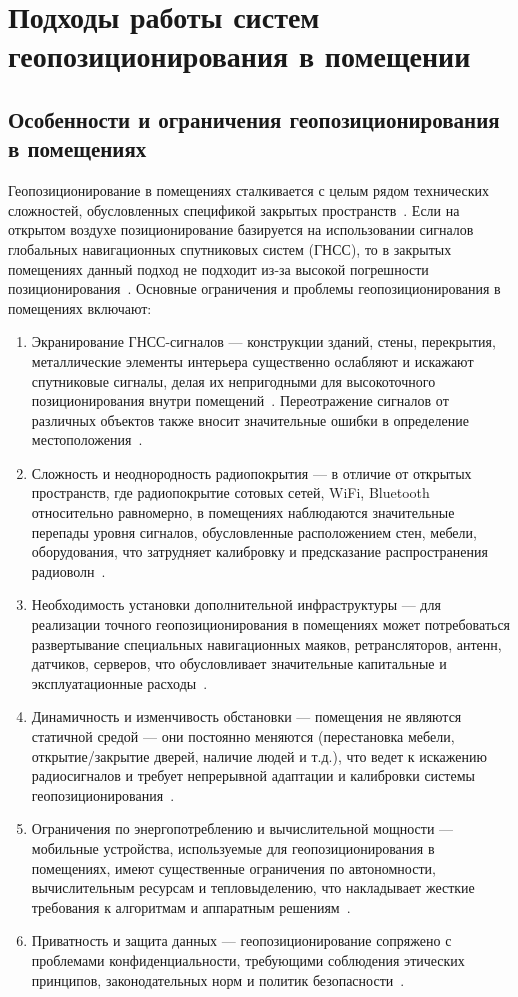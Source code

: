 \section{Подходы работы систем геопозиционирования в помещении}

\subsection{Особенности и ограничения геопозиционирования в помещениях}

Геопозиционирование в помещениях сталкивается с целым рядом технических сложностей, обусловленных спецификой закрытых пространств~\cite{basebook}. Если на открытом воздухе позиционирование базируется на использовании сигналов глобальных навигационных спутниковых систем (ГНСС), то в закрытых помещениях данный подход не подходит из-за высокой погрешности позиционирования~\cite{intro}. Основные ограничения и проблемы геопозиционирования в помещениях включают:

\begin{enumerate}
    \item Экранирование ГНСС-сигналов --- конструкции зданий, стены, перекрытия, металлические элементы интерьера существенно ослабляют и искажают спутниковые сигналы, делая их непригодными для высокоточного позиционирования внутри помещений~\cite{shielding}. Переотражение сигналов от различных объектов также вносит значительные ошибки в определение местоположения~\cite{shielding}.
    \item Сложность и неоднородность радиопокрытия --- в отличие от открытых пространств, где радиопокрытие сотовых сетей, WiFi, Bluetooth относительно равномерно, в помещениях наблюдаются значительные перепады уровня сигналов, обусловленные расположением стен, мебели, оборудования, что затрудняет калибровку и предсказание распространения радиоволн~\cite{heterogenity}.
    \item Необходимость установки дополнительной инфраструктуры --- для реализации точного геопозиционирования в помещениях может потребоваться развертывание специальных навигационных маяков, ретрансляторов, антенн, датчиков, серверов, что обусловливает значительные капитальные и эксплуатационные расходы~\cite{basebook}.
    \item Динамичность и изменчивость обстановки --- помещения не являются статичной средой --- они постоянно меняются (перестановка мебели, открытие/закрытие дверей, наличие людей и т.д.), что ведет к искажению радиосигналов и требует непрерывной адаптации и калибровки системы геопозиционирования~\cite{adaptation}.
    \item Ограничения по энергопотреблению и вычислительной мощности --- мобильные устройства, используемые для геопозиционирования в помещениях, имеют существенные ограничения по автономности, вычислительным ресурсам и тепловыделению, что накладывает жесткие требования к алгоритмам и аппаратным решениям~\cite{econsumption}.
    \item Приватность и защита данных --- геопозиционирование сопряжено с проблемами конфиденциальности, требующими соблюдения этических принципов, законодательных норм и политик безопасности~\cite{privacy}.
\end{enumerate}

